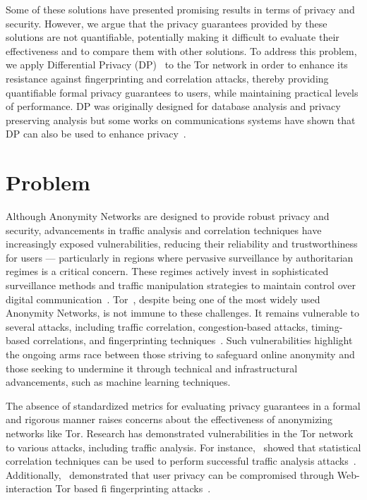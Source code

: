 Some of these solutions have presented promising results in terms of privacy and security. However, we argue that the privacy guarantees provided by these solutions are not quantifiable, potentially making it difficult to evaluate their effectiveness and to compare them with other solutions. To address this problem, we apply Differential Privacy (DP)~\cite*{DifPrivacy,DifPrivacyCalNoise,DP_Book} to the Tor network in order to enhance its resistance against fingerprinting and correlation attacks, thereby providing quantifiable formal privacy guarantees to users, while maintaining practical levels of performance. DP was originally designed for database analysis and privacy preserving analysis but some works on communications systems have shown that DP can also be used to enhance privacy~\cite*{Loopix, Stadium, VilalongaINForum, StatPrivStreaming, NetShaper}. 


\section{Problem}\label{sec:problem}
Although Anonymity Networks are designed to provide robust privacy and security, advancements in traffic analysis and correlation techniques have increasingly exposed vulnerabilities, reducing their reliability and trustworthiness for users — particularly in regions where pervasive surveillance by authoritarian regimes is a critical concern. These regimes actively invest in sophisticated surveillance methods and traffic manipulation strategies to maintain control over digital communication~\cite*{aryan2013internet, zittrain2017shifting, alimardani2018internet}.
Tor~\cite{dingledine2004tor}, despite being one of the most widely used Anonymity Networks, is not immune to these challenges. It remains vulnerable to several attacks, including traffic correlation, congestion-based attacks, timing-based correlations, and fingerprinting techniques~\cite*{chakravarty2014trafficanalysis, johnson2013users,winter2012great, robjansen2019dosontor}. Such vulnerabilities highlight the ongoing arms race between those striving to safeguard online anonymity and those seeking to undermine it through technical and infrastructural advancements, such as machine learning techniques.

The absence of standardized metrics for evaluating privacy guarantees in a formal and rigorous manner raises concerns about the effectiveness of anonymizing networks like Tor. Research has demonstrated vulnerabilities in the Tor network to various attacks, including traffic analysis. For instance,~\citeauthor{chakravarty2014trafficanalysis} showed that statistical correlation techniques can be used to perform successful traffic analysis attacks~\cite{chakravarty2014trafficanalysis}. Additionally,~\citeauthor{yi2009fingerprinting} demonstrated that user privacy can be compromised through Web-interaction Tor based fi fingerprinting attacks~\cite{yi2009fingerprinting}.

